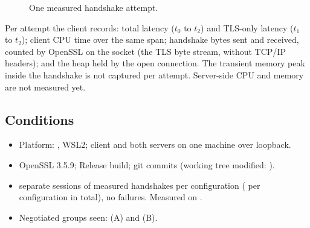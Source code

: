 \documentclass[11pt,a4paper]{article}
\begin{document}
\begin{figure}[h]
\centering
{}
\caption{One measured handshake attempt.}
\label{fig:bench}
\end{figure}

Per attempt the client records: total latency ($t_0$ to $t_2$) and TLS-only latency ($t_1$ to
$t_2$); client CPU time over the same span; handshake bytes sent and received, counted by OpenSSL
on the socket (the TLS byte stream, without TCP/IP headers); and the heap held by the open
connection. The transient memory peak inside the handshake is not captured per attempt. Server-side
CPU and memory are not measured yet.

\subsection{Conditions}

\begin{itemize}\setlength\itemsep{0pt}
\item Platform: \CpuModel, WSL2; client and both servers on one machine over loopback.
\item OpenSSL 3.5.9; Release build; git commits \GitCommits{} (working tree modified: \GitDirty).
\item \NSessions{} separate sessions of \NPerSession{} measured handshakes per configuration
      (\NPerConfig{} per configuration in total), no failures. Measured on \RunDate.
\item Negotiated groups seen: \texttt{\GroupA} (A) and \texttt{\GroupB} (B).
\end{itemize}
\end{document}
